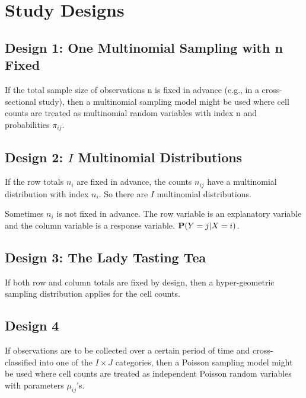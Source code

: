 \section{Study Designs}

\subsection{Design 1: One Multinomial Sampling with n Fixed}
If the total sample size of observations n is fixed in advance
(e.g., in a cross-sectional study), then a multinomial sampling
model might be used where cell counts are treated as
multinomial random variables with index n and probabilities $\pi_{ij}$.

\subsection{Design 2: $I$ Multinomial Distributions}
If the row totals $n_i$ are fixed in advance, the counts $n_{ij}$ have a
multinomial distribution with index $n_i$. So there are $I$ multinomial distributions.

Sometimes $n_i$ is not fixed in advance. The row variable is an explanatory variable and the column variable is a response variable. $\P(Y = j| X = i)$.

\subsection{Design 3: The Lady Tasting Tea}
If both row and column totals are fixed by design, then a
hyper-geometric sampling distribution applies for the cell counts.

\subsection{Design 4}
If observations are to be collected over a certain period of time
and cross-classified into one of the $I \times J$ categories, then a
Poisson sampling model might be used where cell counts are
treated as independent Poisson random variables with
parameters $\mu_{ij}$'s.
